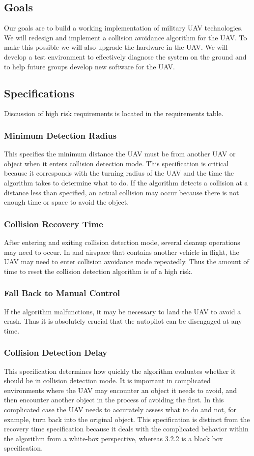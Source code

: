 \documentclass[12pt]{article}
\begin{document}
\subsection{Goals}
	Our goals are to build a working implementation of military UAV technologies. We will redesign and implement a collision avoidance algorithm for the UAV. To make this possible we will also upgrade the hardware in the UAV. We will develop a test environment to effectively diagnose the system on the ground and to help future groups develop new software for the UAV.

\subsection{Specifications}
	Discussion of high risk requirements is located in the requirements table.

\subsubsection{Minimum Detection Radius}
	This specifies the minimum distance the UAV must be from another UAV or object when it enters collision detection mode. This specification is critical because it corresponds with the turning radius of the UAV and the time the algorithm takes to determine  what to do. If the algorithm detects a collision at a distance less than specified, an actual collision may occur because there is not enough time or space to avoid the object.

\subsubsection{Collision Recovery Time}
	After entering and exiting collision detection mode, several cleanup operations may need to occur. In and airspace that contains another vehicle in flight, the UAV may need to enter collision avoidance mode repeatedly. Thus the amount of time to reset the collision detection algorithm is of a high risk.

\subsubsection{Fall Back to Manual Control}
	If the algorithm malfunctions, it may be necessary to land the UAV to avoid a crash. Thus it is absolutely crucial that the autopilot can be disengaged at any time. 

\subsubsection{Collision Detection Delay}
	This specification determines how quickly the algorithm evaluates whether it should be in collision detection mode. It is important in complicated environments where the UAV may encounter an object it needs to avoid, and then encounter another object in the process of avoiding the first. In this complicated case the UAV needs to accurately assess what to do and not, for example, turn back into the original object. This specification is distinct from the recovery time specification because it deals with the complicated behavior within the algorithm from a white-box perspective, whereas 3.2.2 is a black box specification.
\end{document}
